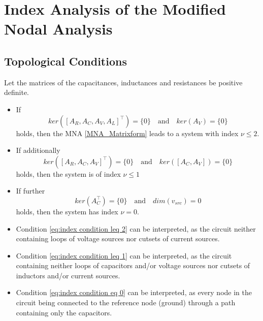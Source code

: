 \section*{Index Analysis of the Modified Nodal Analysis}
	\subsection{Topological Conditions}
	\begin{frame}
		\begin{theorem}[Index conditions] %
			Let the matrices of the capacitances, inductances and resistances be positive definite.
			\begin{itemize}
				\item If
				\begin{equation}
					\label{eq:index condition leq 2}
					ker([A_R, A_C, A_V, A_L]^\top) = \{0\} \quad \text{and} \quad ker(A_V) = \{0\}
				\end{equation}
				holds, then the MNA \eqref{MNA_Matrixform} leads to a system with index $\nu \leq 2$.
				
				\item If additionally
				\begin{equation}
					\label{eq:index condition leq 1}
					ker([A_R, A_C, A_V]^\top) = \{0\} \quad \text{and} \quad ker([A_C, A_V]) = \{0\}
				\end{equation}
				holds, then the system is of index $\nu \leq 1$
				
				\item If further
				\begin{equation}
					\label{eq:index condition eq 0}
					ker(A_C^\top) = \{0\} \quad \text{and} \quad dim(v_{src}) = 0
				\end{equation}
				holds, then the system has index $\nu = 0$.
			\end{itemize}
		\end{theorem}
	\end{frame}
	\begin{frame}
		\begin{itemize}
			\item Condition \eqref{eq:index condition leq 2} can be interpreted, as the circuit neither containing loops of voltage sources nor cutsets of current sources.
			\item Condition \eqref{eq:index condition leq 1} can be interpreted, as the circuit containing neither loops of capacitors and/or voltage sources nor cutsets of inductors and/or current sources.
			\item Condition \eqref{eq:index condition eq 0} can be interpreted, as every node in the circuit being connected to the reference node (ground) through a path containing only the capacitors.
		\end{itemize}
	\end{frame}

